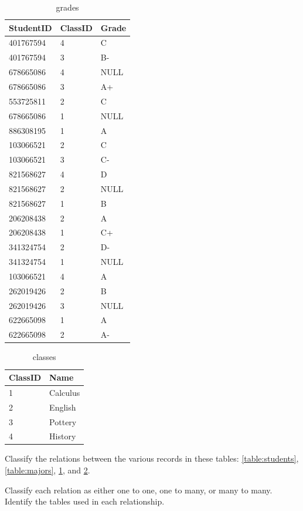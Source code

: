 \begin{table}
\begin{tabular}{|l|l|l|}
\hline
StudentID & ClassID & Grade \\
\hline
401767594 & 4 & C \\
401767594 & 3 & B- \\
678665086 & 4 & NULL \\
678665086 & 3 & A+ \\
553725811 & 2 & C \\
678665086 & 1 & NULL \\
886308195 & 1 & A \\
103066521 & 2 & C \\
103066521 & 3 & C- \\
821568627 & 4 & D \\
821568627 & 2 & NULL \\
821568627 & 1 & B \\
206208438 & 2 & A \\
206208438 & 1 & C+ \\
341324754 & 2 & D- \\
341324754 & 1 & NULL \\
103066521 & 4 & A \\
262019426 & 2 & B \\
262019426 & 3 & NULL \\
622665098 & 1 & A \\
622665098 & 2 & A- \\
\hline
\end{tabular}
\caption{grades}
\label{table:grades}
\end{table}

\begin{table}
\begin{tabular}{|l|l|}
\hline
ClassID & Name \\
\hline
1 & Calculus \\
2 & English \\
3 & Pottery \\
4 & History \\
\hline
\end{tabular}
\caption{classes}
\label{table:classes}
\end{table}

\begin{problem}
Classify the relations between the various records in these tables: \ref{table:students}, \ref{table:majors}, \ref{table:grades}, and \ref{table:classes}.

Classify each relation as either one to one, one to many, or many to many.
Identify the tables used in each relationship.
\end{problem}

